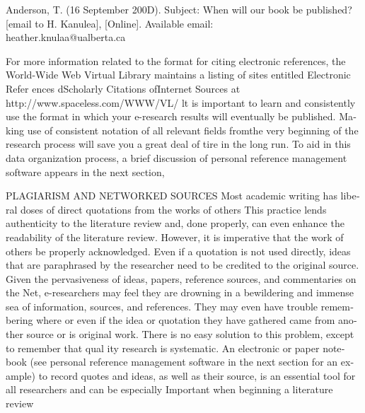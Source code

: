 \documentclass[a4paper,12pt]{article}
\begin{document}
\begin{latin}
\indent
Anderson, T. (16 September  200D). Subject: When will our book be published? [email
to H.  Kanulea],  [Online]. Available email:\\  heather.knulaa@ualberta.ca

\vspace{0.1cm}
\vspace{0.1cm}
\vspace{0.1cm}

For   more  information related   to the   format  for  citing  electronic references,  the World-Wide Web  Virtual  Library  maintains a listing  of sites entitled Electronic Refer­ ences dScholarly Citations ofInternet Sources at http://www.spaceless.com/WWW/VL/ lt is important to learn  and consistently use the  format  in which your e-research
results will eventually  be published. Making  use of consistent notation of all relevant fields fromthe very beginning of the research  process  will save you  a great deal of tire in the long run. To aid  in this  data  organization process, a brief discussion of personal reference management software appears  in the  next  section,
\vspace{0.1cm}
\vspace{0.1cm}
\vspace{0.1cm}



\indent
PLAGIARISM  AND NETWORKED SOURCES
\noindent
Most academic writing has liberal doses of direct quotations from the  works of others This practice lends  authenticity to the  literature review and,  done properly, can even enhance the  readability of the  literature review.  However, it  is imperative that   the work  of others be properly acknowledged. Even if a quotation is not  used  directly, ideas that  are paraphrased by the  researcher need to be credited to the  original source. Given  the  pervasiveness of ideas, papers,  reference sources,  and  commentaries on  the Net, e-researchers may  feel  they are  drowning in a bewildering and immense sea of information, sources, and  references. They may even  have trouble remembering where  or even if the  idea  or quotation they   have  gathered came from  another source or is original work.  There is no easy  solution to this problem, except  to remember that qual­ ity  research is  systematic. An  electronic or  paper notebook (see  personal reference management software in the next  section for an  example) to record quotes  and ideas, as well  as  their source, is  an  essential  tool for  all  researchers and can  be especially Important when beginning a literature review



\end{latin}
\end{document}
